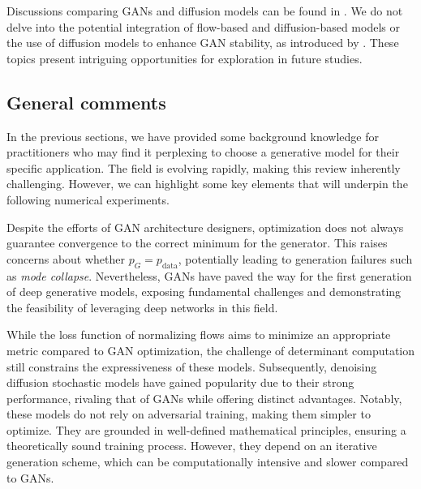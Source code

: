 \documentclass[fleqn,usenatbib]{mnras}
\begin{document}
Discussions comparing GANs and diffusion models can be found in \cite{dhariwal2021diffusion}. We do not delve into the potential integration of flow-based and diffusion-based models \citep[e.g.,][]{zhang2021diffusion,gong2021interpreting} or the use of diffusion models to enhance GAN stability, as introduced by \cite{Wang2023}. These topics present intriguing opportunities for exploration in future studies.
%

{\color{red}
\subsection{General comments}
%

In the previous sections, we have provided some background knowledge for practitioners who may find it perplexing to choose a generative model for their specific application. The field is evolving rapidly, making this review inherently challenging. However, we can highlight some key elements that will underpin the following numerical experiments.

Despite the efforts of GAN architecture designers, optimization does not always guarantee convergence to the correct minimum for the generator. This raises concerns about whether $p_G = p_{\text{data}}$, potentially leading to generation failures such as \textit{mode collapse}. Nevertheless, GANs have paved the way for the first generation of deep generative models, exposing fundamental challenges and demonstrating the feasibility of leveraging deep networks in this field.  

While the loss function of normalizing flows aims to minimize an appropriate metric compared to GAN optimization, the challenge of determinant computation still constrains the expressiveness of these models. Subsequently, denoising diffusion stochastic models have gained popularity due to their strong performance, rivaling that of GANs while offering distinct advantages. Notably, these models do not rely on adversarial training, making them simpler to optimize. They are grounded in well-defined mathematical principles, ensuring a theoretically sound training process. However, they depend on an iterative generation scheme, which can be computationally intensive and slower compared to GANs.  

}
\end{document}
